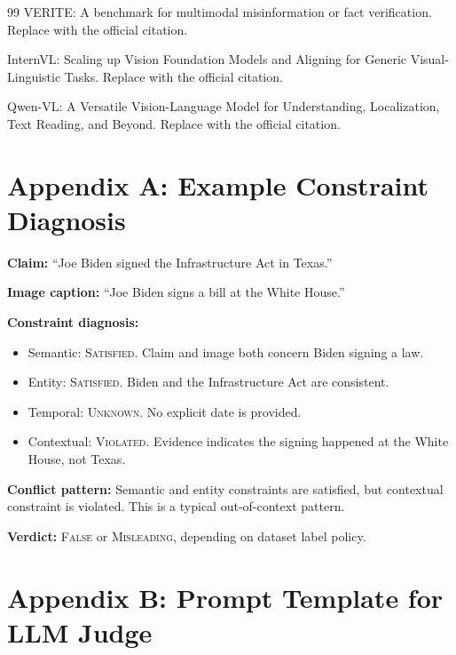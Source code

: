 \documentclass[11pt,a4paper]{article}
\newcommand{\False}{\textsc{False}}
\newcommand{\Misleading}{\textsc{Misleading}}
\newcommand{\Sat}{\textsc{Satisfied}}
\newcommand{\Viol}{\textsc{Violated}}
\newcommand{\Unk}{\textsc{Unknown}}
\begin{document}
\begin{thebibliography}{99}
VERITE: A benchmark for multimodal misinformation or fact verification.
\newblock Replace with the official citation.

InternVL: Scaling up Vision Foundation Models and Aligning for Generic Visual-Linguistic Tasks.
\newblock Replace with the official citation.

Qwen-VL: A Versatile Vision-Language Model for Understanding, Localization, Text Reading, and Beyond.
\newblock Replace with the official citation.

\end{thebibliography}

\appendix

\section{Appendix A: Example Constraint Diagnosis}

\textbf{Claim:} ``Joe Biden signed the Infrastructure Act in Texas.''

\textbf{Image caption:} ``Joe Biden signs a bill at the White House.''

\textbf{Constraint diagnosis:}

\begin{itemize}[leftmargin=1.5em]
\item Semantic: \Sat. Claim and image both concern Biden signing a law.
\item Entity: \Sat. Biden and the Infrastructure Act are consistent.
\item Temporal: \Unk. No explicit date is provided.
\item Contextual: \Viol. Evidence indicates the signing happened at the White House, not Texas.
\end{itemize}

\textbf{Conflict pattern:}
Semantic and entity constraints are satisfied, but contextual constraint is violated. This is a typical out-of-context pattern.

\textbf{Verdict:} \False{} or \Misleading{}, depending on dataset label policy.

\section{Appendix B: Prompt Template for LLM Judge}
\end{document}

